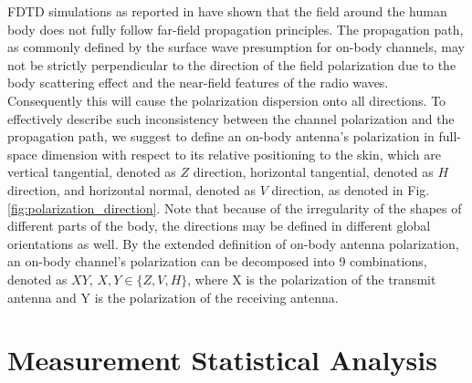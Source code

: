 \documentclass[conference]{IEEEtran}
\begin{document}
FDTD simulations as reported in \cite{} have shown that the field around the human body does not fully follow far-field propagation principles. The propagation path, as commonly defined by the surface wave presumption for on-body channels, may not be strictly perpendicular to the direction of the field polarization due to the body scattering effect and the near-field features of the radio waves. Consequently this will cause the polarization dispersion onto all directions. To effectively describe such inconsistency between the channel polarization and the propagation path, we suggest to define an on-body antenna's polarization in full-space dimension with respect to its relative positioning to the skin, which are vertical tangential, denoted as $Z$ direction, horizontal tangential, denoted as $H$ direction, and horizontal normal, denoted as $V$ direction, as denoted in Fig. \ref{fig:polarization_direction}. Note that because of the irregularity of the shapes of different parts of the body, the directions may be defined in different global orientations as well. By the extended definition of on-body antenna polarization, an on-body channel's polarization can be decomposed into 9 combinations, denoted as $XY$, $X, Y \in \{Z,V,H\}$, where X is the polarization of the transmit antenna and Y is the polarization of the receiving antenna. 

\section{Measurement Statistical Analysis}\label{sec:analysis}

\begin{table}[!t]
\centering
\captionsetup{labelsep=newline}
\caption{Path loss summary of measurements [dB]}
\label{tab:2}
\end{table}
\end{document}
